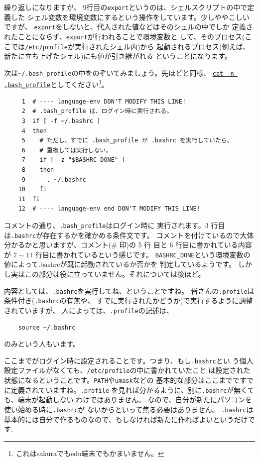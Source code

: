 \documentclass[a4j]{ltjreport}
\begin{document}
    繰り返しになりますが、
    9行目の\verb+export+というのは、シェルスクリプトの中で定義した
    シェル変数を環境変数にするという操作をしています。少しややこしいですが、
    \verb+export+をしないと、代入された値などはそのシェルの中でしか
    定義されたことにならず、\verb+export+が行われることで環境変数と
    して、そのプロセス(ここでは\verb+/etc/profile+が実行されたシェル内)から
    起動されるプロセス(例えば、新たに立ち上げたシェル)にも値が引き継がれる
    ということになります。

    \vspace*{3mm}

    次は\verb+~/.bash_profile+の中をのぞいてみましょう。先ほどと同様、
    \underline{\texttt{cat -n .bash\_profile}}としてください\footnote{これはsakuraでもedu端末でもかまいません。}。

    \begin{verbatim}
     1  # ---- language-env DON'T MODIFY THIS LINE!
     2  # .bash_profile は、ログイン時に実行される。
     3  if [ -f ~/.bashrc ]
     4  then
     5    # ただし、すでに .bash_profile が .bashrc を実行していたら、
     6    # 重複しては実行しない。
     7    if [ -z "$BASHRC_DONE" ]
     8    then
     9      . ~/.bashrc
    10    fi
    11  fi
    12  # ---- language-env end DON'T MODIFY THIS LINE!
    \end{verbatim}

    コメントの通り、\verb+.bash_profile+はログイン時に
    実行されます。3 行目は\verb+.bashrc+が存在するかを確かめる条件文です。
    コメントを付けているので大体分かるかと思いますが、コメント(\# 印)の 5 行
    目と 6 行目に書かれている内容が $7 \sim 11$ 行目に書かれているという感じです。
    \verb+BASHRC_DONE+という環境変数の値によって.bashrcが既に起動されているか否かを
    判定しているようです。
    しかし実はこの部分は役に立っていません。それについては後ほど。

    内容としては、\verb+.bashrc+を実行してね、ということですね。
    皆さんの\verb+.profile+は条件付き(\verb+.bashrc+の有無や、
    すでに実行されたかどうか)で実行するように調整されていますが、
    人によっては、\verb+.profile+の記述は、
    \begin{verbatim}
    source ~/.bashrc
    \end{verbatim}
    のみという人もいます。

    \vspace*{3mm}

    ここまでがログイン時に設定されることです。つまり、もし\verb+.bashrc+とい
    う個人設定ファイルがなくても、\verb+/etc/profile+の中に書かれていたこと
    は設定された状態になるということです。\verb+PATH+や\verb+umask+などの
    基本的な部分はここまでですでに定義されていますね。\verb+.profile+
    を見れば分かるように、別に\verb+.bashrc+が無くても、端末が起動しない
    わけではありません。
    なので、自分が新たにパソコンを使い始める時に\verb+.bashrc+が
    ないからといって焦る必要はありません。
    \verb+.bashrc+は基本的には自分で作るものなので、もしなければ新たに作ればよいというだけです.
    
\end{document}
